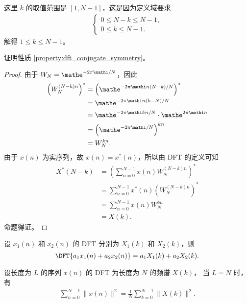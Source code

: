 \begin{note}
    这里 $k$ 的取值范围是 $[1, N-1]$，这是因为定义域要求
    \begin{align*}
        \begin{cases}
            0 \le N - k \le N - 1, \\
            0 \le k \le N - 1.
        \end{cases}
    \end{align*}
    解得 $1 \le k \le N - 1$。
\end{note}

\begin{homework}
    证明性质 \ref{property:dft_conjugate_symmetry}。
\end{homework}

\begin{proof}
    由于 $W_N = \mathe^{-2\pi\mathi/N}$，因此
    \begin{align*}
        \left(W_N^{(N - k)n}\right)^* & = \left(\mathe^{-2\pi\mathi n(N-k)/N}\right)^* \\
        & = \mathe^{-2\pi\mathi n(k-N)/N} \\
        & = \mathe^{-2\pi\mathi kn/N} \cdot \mathe^{2\pi\mathi n} \\
        & = \left(\mathe^{-2\pi\mathi/N}\right)^{kn} \\
        & = W_N^{kn}.
    \end{align*}
    由于 $x(n)$ 为实序列，故 $x(n) = x^*(n)$，所以由 DFT 的定义可知
    \begin{align*}
        X^*(N - k) & = \left(\sum_{n = 0}^{N - 1} x(n)W_N^{(N - k)n}\right)^* \\
        & = \sum_{n = 0}^{N - 1} x^*(n)\left(W_N^{(N - k)n}\right)^* \\
        & = \sum_{n = 0}^{N - 1} x(n)W_N^{kn} \\
        & = X(k).
    \end{align*}
    命题得证。
\end{proof}

\begin{property}
    设 $x_1(n)$ 和 $x_2(n)$ 的 DFT 分别为 $X_1(k)$ 和 $X_2(k)$，则
    \begin{align*}
        \DFT{a_1x_1(n) + a_2x_2(n)} = a_1X_1(k) + a_2X_2(k).
    \end{align*}
\end{property}

\begin{property}
    设长度为 $L$ 的序列 $x(n)$ 的 DFT 为长度为 $N$ 的频谱 $X(k)$，
    当 $L = N$ 时，有
    \begin{align*}
        \sum_{n = 0}^{N - 1}\|x(n)\|^2 = \frac{1}{N}\sum_{k = 0}^{N - 1}\|X(k)\|^2.
    \end{align*}
\end{property}

